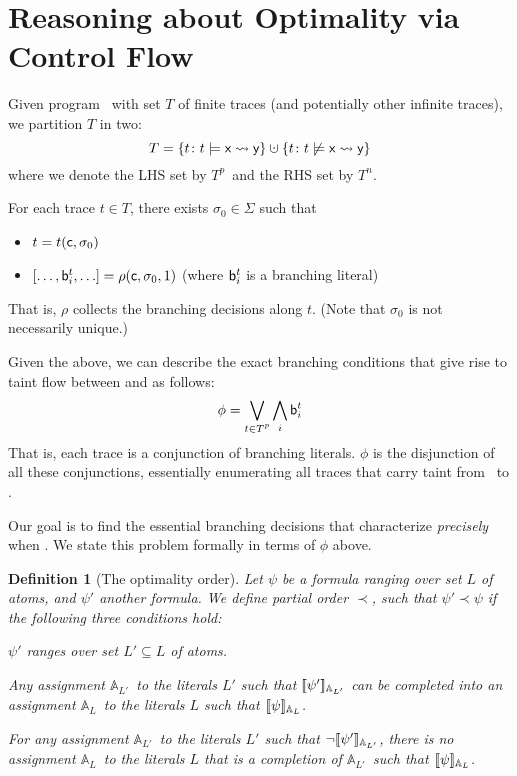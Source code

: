 \documentclass[]{article}
\newcommand{\lsyn}{[\![}
\newcommand{\rsyn}{]\!]}
\newtheorem{defn}{Definition}
\begin{document}
\newcommand{\cupdot}{\mathbin{\mathaccent\cdot\cup}}

\newcommand{\Tp}{\textnormal{$T^p$}}
\newcommand{\Tn}{\textnormal{$T^n$}}

\section{Reasoning about Optimality via Control Flow}

Given program \prog\ with set $T$ of finite traces (and potentially other infinite traces), we partition $T$ in two:
$$
T = \{ t \colon t \models \query{\xvar}{\yvar} \} \cupdot \{ t \colon t \not\models \query{\xvar}{\yvar} \}
$$
where we denote the LHS set by \Tp\ and the RHS set by \Tn.

For each trace $t \in T$, there exists $\sigma_0 \in \Sigma$ such that
\begin{itemize}
	\item $t=t({\sf c},\sigma_0)$
	\item $[ \ldots, {\sf b}^t_i, \ldots ] = \rho({\sf c},\sigma_0,1)$ (where ${\sf b}^t_i$ is a branching literal)
\end{itemize}
That is, $\rho$ collects the branching decisions along $t$. (Note that $\sigma_0$ is not necessarily unique.)

Given the above, we can describe the exact branching conditions that give rise to taint flow between \xvar and \yvar as follows:
\begin{equation}\label{Eq:preciseCond}
	\phi = \bigvee_{t \in \Tp} \bigwedge_i {\sf b}^t_i 
\end{equation}
That is, each trace is a conjunction of branching literals. $\phi$ is the disjunction of all these conjunctions, essentially enumerating all traces that carry taint from \xvar\ to \yvar.

Our goal is to find the essential branching decisions that characterize \emph{precisely} when \query{\xvar}{\yvar}. We state this problem formally in terms of $\phi$ above.

\newcommand{\asgn}{\textnormal{$\mathbb{A}$}}
\newcommand{\asgnL}{\textnormal{$\mathbb{A}_L$}}
\newcommand{\asgnLP}{\textnormal{$\mathbb{A}_{L'}$}}

\begin{defn}[The optimality order] Let $\psi$ be a formula ranging over set $L$ of atoms, and $\psi'$ another formula. We define partial order $\prec$, such that $\psi' \prec \psi$ if the following three conditions hold:
	\item $\psi'$ ranges over set $L' \subseteq L$ of atoms.
	\item Any assignment \asgnLP\ to the literals $L'$ such that $\lsyn \psi' \rsyn_{\asgnLP}$ can be completed into an assignment \asgnL\ to the literals $L$ such that $\lsyn \psi \rsyn_{\asgnL}$.
	\item For any assignment \asgnLP\ to the literals $L'$ such that $\neg \lsyn \psi' \rsyn_{\asgnLP}$, there is no assignment \asgnL\ to the literals $L$ that is a completion of \asgnLP\ such that $\lsyn \psi \rsyn_{\asgnL}$.
\end{defn}
\end{document}
